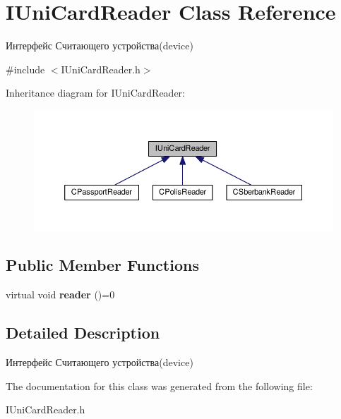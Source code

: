\hypertarget{classIUniCardReader}{}\section{I\+Uni\+Card\+Reader Class Reference}
\label{classIUniCardReader}


Интерфейс Считающего устройства(device)  




{\ttfamily \#include $<$I\+Uni\+Card\+Reader.\+h$>$}



Inheritance diagram for I\+Uni\+Card\+Reader\+:\nopagebreak
\begin{figure}[H]
\begin{center}
\leavevmode
\includegraphics[width=350pt]{classIUniCardReader__inherit__graph}
\end{center}
\end{figure}
\subsection*{Public Member Functions}
\begin{DoxyCompactItemize}
\item 
\mbox{\label{classIUniCardReader_abcfe21ca7541476fa85275c489d84f91}} 
virtual void {\bfseries reader} ()=0
\end{DoxyCompactItemize}


\subsection{Detailed Description}
Интерфейс Считающего устройства(device) 

The documentation for this class was generated from the following file\+:\begin{DoxyCompactItemize}
\item 
I\+Uni\+Card\+Reader.\+h\end{DoxyCompactItemize}

